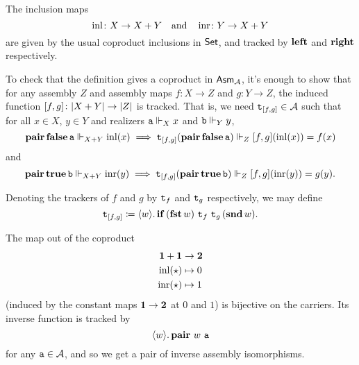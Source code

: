 


The inclusion maps
\[ \operatorname{inl} \colon X \to X + Y \quad \text{and} \quad \operatorname{inr} \colon Y \to X + Y \]
are given by the usual coproduct inclusions in \(\mathsf{Set}\),
and tracked by \(\operatorname{\mathbf{left}}\) and \(\operatorname{\mathbf{right}}\) respectively.

To check that the definition gives a coproduct in \(\mathsf{Asm}_{\mathcal A}\),
it's enough to show that for any assembly \(Z\) and assembly maps
\(f \colon X \to Z\) and \(g\colon Y \to Z\), the induced function
\([f,g] \colon \lvert X+Y\rvert \to \lvert Z\rvert\) is tracked.
That is, we need \(\operatorname{\mathtt{t}}_{[f,g]} \in \mathcal A\) such that for all
\(x \in X\), \(y \in Y\) and realizers
\(\operatorname{\mathtt{a}} \Vdash_X x\) and \(\operatorname{\mathtt{b}} \Vdash_Y y\),
\[ \operatorname{\mathbf{pair}} \operatorname{\mathbf{false}} \operatorname{\mathtt{a}} \Vdash_{X+Y} \operatorname{inl}(x) \implies
  \operatorname{\mathtt{t}}_{[f,g]} (\operatorname{\mathbf{pair}} \operatorname{\mathbf{false}} \operatorname{\mathtt{a}}) \Vdash_Z [f,g](\operatorname{inl}(x)) = f(x) \]
and
\[ \operatorname{\mathbf{pair}} \operatorname{\mathbf{true}} \operatorname{\mathtt{b}} \Vdash_{X+Y} \operatorname{inr}(y) \implies
  \operatorname{\mathtt{t}}_{[f,g]} (\operatorname{\mathbf{pair}} \operatorname{\mathbf{true}} \operatorname{\mathtt{b}}) \Vdash_Z [f,g](\operatorname{inr}(y)) = g(y). \]

Denoting the trackers of \(f\) and \(g\) by \(\operatorname{\mathtt{t}}_f\) and \(\operatorname{\mathtt{t}}_g\)
respectively, we may define
\[ \operatorname{\mathtt{t}}_{[f,g]} \coloneq
  \langle{{w}}\rangle.\,{\operatorname{\mathbf{if}} \, (\operatorname{\mathbf{fst}} w) \, \operatorname{\mathtt{t}}_f \, \operatorname{\mathtt{t}}_g \, (\operatorname{\mathbf{snd}} w)}. \]




The map out of the coproduct
\begin{align*}
  \mathbf 1 + \mathbf 1 & \to \mathbf 2 \\
  \operatorname{inl}(\star) & \mapsto 0 \\
  \operatorname{inr}(\star) & \mapsto 1
\end{align*}
(induced by the constant maps \(\mathbf 1 \to \mathbf 2\) at \(0\) and \(1\))
is bijective on the carriers.
Its inverse function is tracked by
\[ \langle{{w}}\rangle.\,{\operatorname{\mathbf{pair}} \, w \, \operatorname{\mathtt{a}}} \]
for any \(\operatorname{\mathtt{a}} \in \mathcal A\), and so we get a pair of inverse assembly
isomorphisms.




